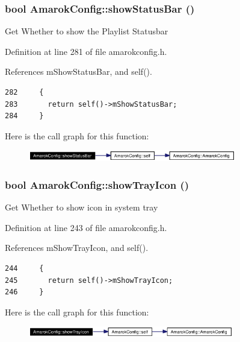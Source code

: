 \subsubsection{\setlength{\rightskip}{0pt plus 5cm}bool Amarok\-Config::show\-Status\-Bar ()\hspace{0.3cm}{\tt  [inline, static]}}\label{classAmarokConfig_AmarokConfige28}


Get Whether to show the Playlist Statusbar 

Definition at line 281 of file amarokconfig.h.

References m\-Show\-Status\-Bar, and self().



\footnotesize\begin{verbatim}282     {
283       return self()->mShowStatusBar;
284     }
\end{verbatim}\normalsize 


Here is the call graph for this function:\begin{figure}[H]
\begin{center}
\leavevmode
\includegraphics[width=257pt]{classAmarokConfig_AmarokConfige28_cgraph}
\end{center}
\end{figure}
\subsubsection{\setlength{\rightskip}{0pt plus 5cm}bool Amarok\-Config::show\-Tray\-Icon ()\hspace{0.3cm}{\tt  [inline, static]}}\label{classAmarokConfig_AmarokConfige24}


Get Whether to show icon in system tray 

Definition at line 243 of file amarokconfig.h.

References m\-Show\-Tray\-Icon, and self().



\footnotesize\begin{verbatim}244     {
245       return self()->mShowTrayIcon;
246     }
\end{verbatim}\normalsize 


Here is the call graph for this function:\begin{figure}[H]
\begin{center}
\leavevmode
\includegraphics[width=254pt]{classAmarokConfig_AmarokConfige24_cgraph}
\end{center}
\end{figure}
